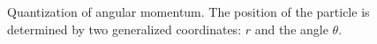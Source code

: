 \begin{figure}
\centering



\caption{Quantization of angular momentum. The position of the particle is determined
  by two generalized coordinates: $r$ and the angle $\theta$.}
\label{figAddQuantAngleMoment}
\end{figure}